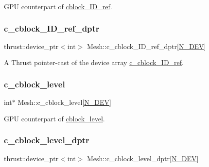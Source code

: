 G\+PU counterpart of \hyperlink{classMesh_a4bc1d7b73f4d7fdae4f547eef4684b7b}{cblock\+\_\+\+I\+D\+\_\+ref}. 

\mbox{\label{classMesh_ae280e8ee23b619ebd3dae41230ecdbe9}} 
\subsubsection{\texorpdfstring{c\+\_\+cblock\+\_\+\+I\+D\+\_\+ref\+\_\+dptr}{c\_cblock\_ID\_ref\_dptr}}
{\footnotesize\ttfamily thrust\+::device\+\_\+ptr$<$int$>$ Mesh\+::c\+\_\+cblock\+\_\+\+I\+D\+\_\+ref\+\_\+dptr\mbox{[}\hyperlink{cppspec_8h_a2b674dab7a14f1bf32b48b7fda5022dc}{N\+\_\+\+D\+EV}\mbox{]}}



A Thrust pointer-\/cast of the device array \hyperlink{classMesh_a061a8950733957c307b6b352c19120b2}{c\+\_\+cblock\+\_\+\+I\+D\+\_\+ref}. 

\mbox{\label{classMesh_a883a91c4cf0446f344115ccbb3bc2f65}} 
\subsubsection{\texorpdfstring{c\+\_\+cblock\+\_\+level}{c\_cblock\_level}}
{\footnotesize\ttfamily int$\ast$ Mesh\+::c\+\_\+cblock\+\_\+level\mbox{[}\hyperlink{cppspec_8h_a2b674dab7a14f1bf32b48b7fda5022dc}{N\+\_\+\+D\+EV}\mbox{]}}



G\+PU counterpart of \hyperlink{classMesh_ab5fd345e916788a1add5c7da96526b16}{cblock\+\_\+level}. 

\mbox{\label{classMesh_a72ac952958af3830c87578c10cb62e7e}} 
\subsubsection{\texorpdfstring{c\+\_\+cblock\+\_\+level\+\_\+dptr}{c\_cblock\_level\_dptr}}
{\footnotesize\ttfamily thrust\+::device\+\_\+ptr$<$int$>$ Mesh\+::c\+\_\+cblock\+\_\+level\+\_\+dptr\mbox{[}\hyperlink{cppspec_8h_a2b674dab7a14f1bf32b48b7fda5022dc}{N\+\_\+\+D\+EV}\mbox{]}}



